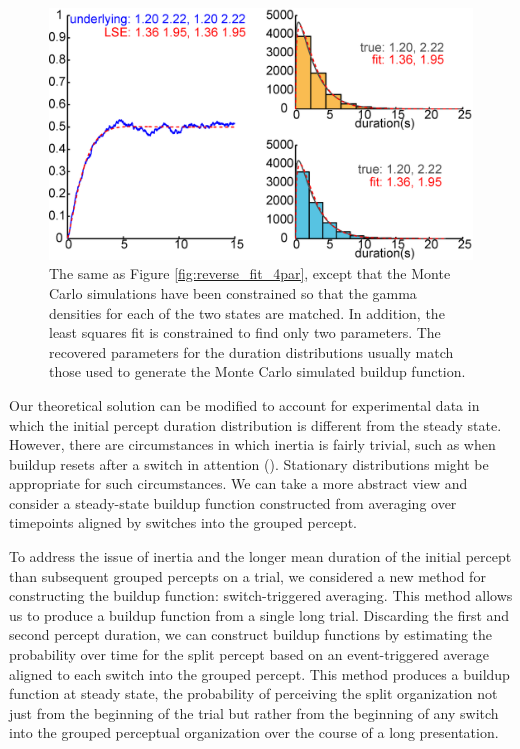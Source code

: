 \documentclass{frontiersSCNS} %
\begin{document}
\begin{figure}
	\centering
	\includegraphics[scale=.35]{../2par_reverse}
	\caption{The same as Figure \ref{fig:reverse_fit_4par}, except that the Monte Carlo simulations have been constrained so that the gamma densities for each of the two states are matched. In addition, the least squares fit is constrained to find only two parameters. The recovered parameters for the duration distributions usually match those used to generate the Monte Carlo simulated buildup function.}
	\label{fig:2par_reverse_fit}
\end{figure}



Our theoretical solution can be modified to account for experimental data in which the initial percept duration distribution is different from the steady state. However, there are circumstances in which inertia is fairly trivial, such as when buildup resets after a switch in attention (\cite{Denham2010}). Stationary distributions might be appropriate for such circumstances. We can take a more abstract view and consider a steady-state buildup function constructed from averaging over timepoints aligned by switches into the grouped percept.

To address the issue of inertia and the longer mean duration of the initial percept than subsequent grouped percepts on a trial, we considered a new method for constructing the buildup function: switch-triggered averaging. This method allows us to produce a buildup function from a single long trial. Discarding the first and second percept duration, we can construct buildup functions by estimating the probability over time for the split percept based on an event-triggered average aligned to each switch into the grouped percept. This method produces a buildup function at steady state, the probability of perceiving the split organization not just from the beginning of the trial but rather from the beginning of any switch into the grouped perceptual organization over the course of a long presentation. 
\end{document}
